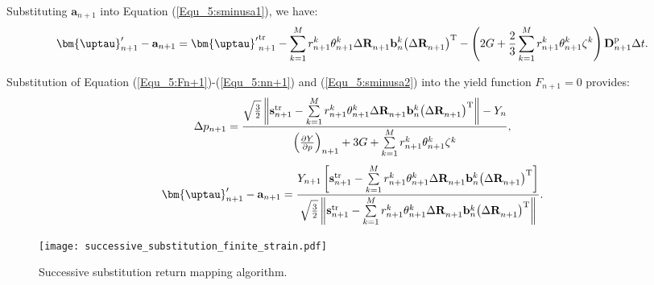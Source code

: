 Substituting ${{\mathbf{a}}_{n + 1}}$ into Equation (\ref{Equ_5:sminusa1}), we have:
\begin{equation}
\label{Equ_5:sminusa2}
\begin{aligned}
{{\bm{\uptau }}'_{n + 1} - {{\mathbf{a}}_{n + 1}}}=
{{\bm{\uptau }}'}_{n + 1}^{\rm tr} - \sum\limits_{k = 1}^M {r_{n + 1}^k\theta _{n + 1}^k \Delta {\mathbf{R}}_{n + 1}^{}{\mathbf{b}}_n^k{\left( {\Delta {\mathbf{R}}_{n + 1}^{}} \right)^{\rm{T}}} }
- \left( {2G + \frac{2}{3}\sum\limits_{k = 1}^M {r_{n + 1}^k\theta _{n + 1}^k{\zeta ^k}} } \right){\mathbf{D }}_{n + 1}^{\rm p} \Delta t.
\end{aligned}
\end{equation}

Substitution of Equation (\ref{Equ_5:Fn+1})-(\ref{Equ_5:nn+1}) and (\ref{Equ_5:sminusa2}) into the yield function ${F_{n + 1}} = 0$ provides:
\begin{equation}
\Delta {p_{n + 1}} = \frac{{\sqrt {\frac{3}{2}} \left\| {{\mathbf{s}}_{n + 1}^{\rm tr} - \sum\limits_{k = 1}^M {r_{n + 1}^k\theta _{n + 1}^k \Delta {\mathbf{R}}_{n + 1}^{}{\mathbf{b}}_n^k{\left( {\Delta {\mathbf{R}}_{n + 1}^{}} \right)^{\rm{T}}} } } \right\| - {Y_n}}}{{{{\left( {\frac{{\partial Y}}{{\partial p}}} \right)}_{n + 1}} + 3G + \sum\limits_{k = 1}^M {r_{n + 1}^k\theta _{n + 1}^k{\zeta ^k}} }},
\end{equation}
\begin{equation}
{{\bm{\uptau }}'_{n + 1} - {{\mathbf{a}}_{n + 1}}} = \frac{{{Y_{n + 1}}\left[ {{\mathbf{s}}_{n + 1}^{\rm tr} - \sum\limits_{k = 1}^M {r_{n + 1}^k\theta _{n + 1}^k \Delta {\mathbf{R}}_{n + 1}^{}{\mathbf{b}}_n^k{\left( {\Delta {\mathbf{R}}_{n + 1}^{}} \right)^{\rm{T}}}} } \right]}}{{\sqrt {\frac{3}{2}} \left\| {{\mathbf{s}}_{n + 1}^{\rm tr} - \sum\limits_{k = 1}^M {r_{n + 1}^k\theta _{n + 1}^k \Delta {\mathbf{R}}_{n + 1}^{}{\mathbf{b}}_n^k{\left( {\Delta {\mathbf{R}}_{n + 1}^{}} \right)^{\rm{T}}}} } \right\|}}.
\end{equation}

\begin{figure}[ht]
	\centering
	\texttt{[image: successive\_substitution\_finite\_strain.pdf]}
	\caption{Successive substitution return mapping algorithm.}
	\label{Fig:successive_substitution_finite_strain}
\end{figure}

